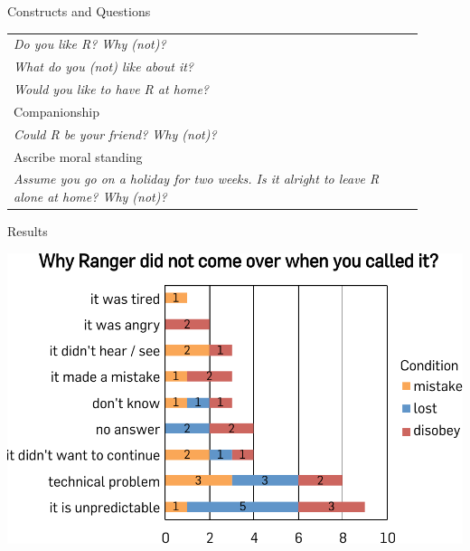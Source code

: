 \documentclass[compress]{beamer}
\renewcommand{\bf}{\Medium}
\begin{document}
\begin{frame}{Constructs and Questions}
\begin{multicols}{2}
\begin{table}[]
\begin{tabularx}{\linewidth}{p{0.9\linewidth}}
    \emph{Do you like R? Why (not)?} \tabularnewline
    \emph{What do you (not) like about it?} \tabularnewline
    \emph{Would you like to have R at home?} \tabularnewline

    \toprule
    {\bf Companionship} \tabularnewline
    \midrule


    \emph{Could R be your friend? Why (not)?}\tabularnewline

    \toprule
    {\bf Ascribe moral standing} \tabularnewline
    \midrule


    \emph{Assume you go on a holiday for two weeks. Is it alright to leave R
    alone at home? Why (not)?} \tabularnewline


            \bottomrule
        \end{tabularx}
        \label{tab:options}
    \end{table}
    \end{multicols}

\end{frame}

\begin{frame}{Results}
    \begin{center}
    \includegraphics[height=0.6\textheight]{domino-why-misbehavior}
    \end{center}
\end{frame}
\end{document}
